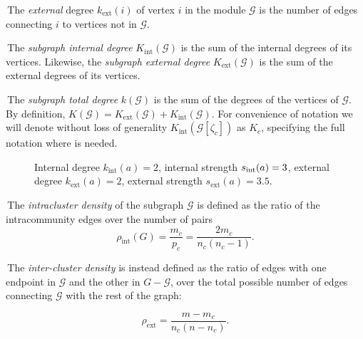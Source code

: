 \noindent\textbullet \,The \emph{external} degree $k_{\textrm{ext}}(i)$ of vertex $i$ in the module $\mathcal{G}$ is the number of edges connecting $i$ to vertices not in $\mathcal{G}$.

\noindent\textbullet \,The \emph{subgraph internal degree} $K_{\textrm{int}}(\mathcal{G})$ is the sum of the internal degrees of its vertices.
Likewise, the \emph{subgraph external degree} $K_{\textrm{ext}}(\mathcal{G})$ is the sum of the external degrees of its vertices.

\noindent\textbullet \,The \emph{subgraph total degree} $k(\mathcal{G})$ is the sum of the degrees of the vertices of $\mathcal{G}$. By definition, $K(\mathcal{G}) = K_{\textrm{ext}}(\mathcal{G}) + K_{\textrm{int}}(\mathcal{G})$. For convenience of notation we will denote without loss of generality $K_{\textrm{int}}(\mathcal{G}[ \zeta_c ])$ as $K_c$, specifying the full notation where is needed.

\begin{figure}[htb]\centering
{}
\caption{Internal degree $k_{\textrm{int}}(a)=2$, internal strength $s_{\textrm{\textrm{int}}}(a)=3$, external degree $k_{\textrm{ext}}(a)=2$, external strength $s_{\textrm{ext}}(a)=3.5$.}
\label{fig:internaldegree}
\end{figure}

\noindent\textbullet \,The \emph{intracluster density} of the subgraph $\mathcal{G}$ is defined as the ratio of the intracommunity edges over the number of pairs 
\begin{equation}
\rho_{\textrm{int}}(G)=\frac{m_c}{p_c} = \frac{2 m_c}{n_c(n_c-1)}.
\end{equation}

\noindent\textbullet \,The \emph{inter-cluster density} is instead defined as the ratio of edges with one endpoint in $\mathcal{G}$ and the other in $G-\mathcal{G}$, over the total possible number of edges connecting $\mathcal{G}$ with the rest of the graph: 

\begin{equation}
\rho_{\textrm{ext}}=\frac{m-m_c}{n_c(n-n_c)}.
\end{equation}

